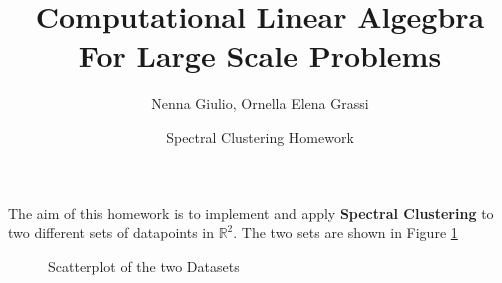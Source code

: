 \documentclass{article}
\title{Computational Linear Algegbra For Large Scale Problems}
\author{Nenna Giulio, Ornella Elena Grassi}
\date{Spectral Clustering Homework}
\numberwithin{equation}{section}
\theoremstyle{definition}
\theoremstyle{plain}
\theoremstyle{definition}
\theoremstyle{remark}
\begin{document}
\maketitle
The aim of this homework is to implement and apply \textbf{Spectral Clustering} to two different sets of datapoints in \(\mathbb{R}^2\). The two sets are shown in Figure \ref{scatter_intro}
\begin{figure}[H]
  \centering
  \qquad
  \qquad
  \caption{Scatterplot of the two Datasets}
  \label{scatter_intro}
\end{figure}
\end{document}

